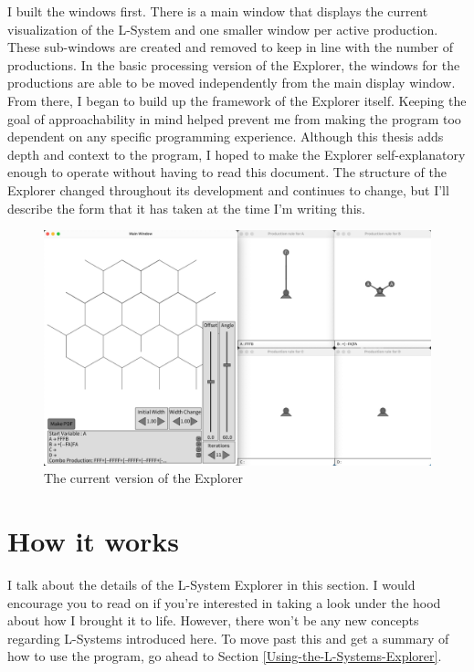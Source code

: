 \documentclass[12pt,twoside]{reedthesis}
\begin{document}
	I built the windows first. There is a main window that displays the current visualization of the L-System and one smaller window per active production. These sub-windows are created and removed to keep in line with the number of productions. In the basic processing version of the Explorer, the windows for the productions are able to be moved independently from the main display window. From there, I began to build up the framework of the Explorer itself. Keeping the goal of approachability in mind helped prevent me from making the program too dependent on any specific programming experience. Although this thesis adds depth and context to the program, I hoped to make the Explorer self-explanatory enough to operate without having to read this document. The structure of the Explorer changed throughout its development and continues to change, but I'll describe the form that it has taken at the time I'm writing this.
	
		
	\begin{figure}[h]
	\centering
	\includegraphics[scale=0.3, frame]{Images/CurrentExplorer}
	\caption{The current version of the Explorer}
	\label {CurrentExplorer}
	\end{figure}
	
\section{How it works}

	I talk about the details of the L-System Explorer in this section. I would encourage you to read on if you're interested in taking a look under the hood about how I brought it to life. However, there won't be any new concepts regarding L-Systems introduced here. To move past this and get a summary of how to use the program, go ahead to Section \ref{Using-the-L-Systems-Explorer}.
	
\end{document}
